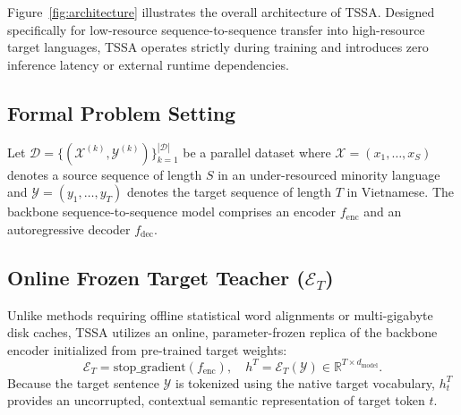 \documentclass[11pt]{article}
\begin{document}
Figure~\ref{fig:architecture} illustrates the overall architecture of TSSA. Designed specifically for low-resource sequence-to-sequence transfer into high-resource target languages, TSSA operates strictly during training and introduces zero inference latency or external runtime dependencies.

\subsection{Formal Problem Setting}
Let $\mathcal{D} = \{(\mathcal{X}^{(k)}, \mathcal{Y}^{(k)})\}_{k=1}^{|\mathcal{D}|}$ be a parallel dataset where $\mathcal{X} = (x_1, \dots, x_S)$ denotes a source sequence of length $S$ in an under-resourced minority language and $\mathcal{Y} = (y_1, \dots, y_T)$ denotes the target sequence of length $T$ in Vietnamese. The backbone sequence-to-sequence model comprises an encoder $f_{\text{enc}}$ and an autoregressive decoder $f_{\text{dec}}$.

\subsection{Online Frozen Target Teacher ($\mathcal{E}_T$)}
Unlike methods requiring offline statistical word alignments or multi-gigabyte disk caches, TSSA utilizes an online, parameter-frozen replica of the backbone encoder initialized from pre-trained target weights:
\begin{equation}
    \mathcal{E}_T = \text{stop\_gradient}(f_{\text{enc}}), \quad h^T = \mathcal{E}_T(\mathcal{Y}) \in \mathbb{R}^{T \times d_{\text{model}}}.
    \label{eq:frozen_teacher}
\end{equation}
Because the target sentence $\mathcal{Y}$ is tokenized using the native target vocabulary, $h_t^T$ provides an uncorrupted, contextual semantic representation of target token $t$.
\end{document}
